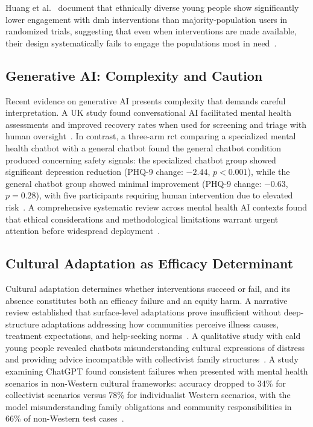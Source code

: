 Huang et al.~\cite{huang_2024} document that ethnically diverse young people show significantly lower engagement with \gls{dmh} interventions than majority-population users in randomized trials, suggesting that even when interventions are made available, their design systematically fails to engage the populations most in need~\cite{huang_2024}.

\subsection{Generative AI: Complexity and Caution}

Recent evidence on generative AI presents complexity that demands careful interpretation. A UK study found conversational AI facilitated mental health assessments and improved recovery rates when used for screening and triage with human oversight~\cite{rollwage_2024}. In contrast, a three-arm \gls{rct} comparing a specialized mental health chatbot with a general chatbot found the general chatbot condition produced concerning safety signals: the specialized chatbot group showed significant depression reduction (PHQ-9 change: $-2.44$, $p < 0.001$), while the general chatbot group showed minimal improvement (PHQ-9 change: $-0.63$, $p = 0.28$), with five participants requiring human intervention due to elevated risk~\cite{he_2022}. A comprehensive systematic review across mental health AI contexts found that ethical considerations and methodological limitations warrant urgent attention before widespread deployment~\cite{dehbozorgi_2025}.

\subsection{Cultural Adaptation as Efficacy Determinant}

Cultural adaptation determines whether interventions succeed or fail, and its absence constitutes both an efficacy failure and an equity harm. A narrative review established that surface-level adaptations prove insufficient without deep-structure adaptations addressing how communities perceive illness causes, treatment expectations, and help-seeking norms~\cite{naderbagi_2024}. A qualitative study with \gls{cald} young people revealed chatbots misunderstanding cultural expressions of distress and providing advice incompatible with collectivist family structures~\cite{soubutts_2024}. A study examining ChatGPT found consistent failures when presented with mental health scenarios in non-Western cultural frameworks: accuracy dropped to 34\% for collectivist scenarios versus 78\% for individualist Western scenarios, with the model misunderstanding family obligations and community responsibilities in 66\% of non-Western test cases~\cite{aleem_2024}.
